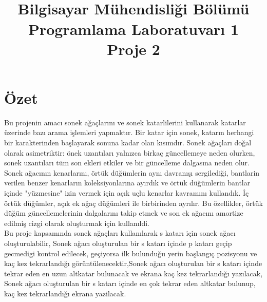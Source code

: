 \documentclass[conference]{IEEEtran}
\begin{document}
\title { \\
\LARGE {Bilgisayar Mühendisliği Bölümü}\\
\huge \textbf{Programlama Laboratuvarı 1}\\
\huge{Proje 2}}

\author
{


\and
{}
}


\maketitle
\section*{\textbf{\LARGE Özet}}
\Large{ Bu projenin amacı sonek ağaçlarını ve sonek katarlilerini kullanarak katarlar üzerinde bazı arama
işlemleri yapmaktır.
Bir katar için sonek, katarın herhangi bir karakterinden başlayarak sonuna kadar olan kısımdır.
Sonek ağaçları doğal olarak asimetriktir: önek uzantıları yalnızca birkaç güncellemeye neden olurken, sonek uzantıları tüm son ekleri etkiler ve bir güncelleme dalgasına neden olur. Sonek ağacının kenarlarını, örtük düğümlerin aynı davranışı sergilediği, bantlarin verilen benzer kenarların koleksiyonlarına ayırdık ve örtük düğümlerin bantlar içinde "yüzmesine" izin vermek için açık uçlu kenarlar kavramını kullandık. İç örtük düğümler, açık ek ağaç düğümleri ile birbirinden ayrılır. Bu özellikler, örtük düğüm güncellemelerinin dalgalarını takip etmek ve son ek ağacını amortize edilmiş cizgi olarak oluşturmak için kullanıldi.\\
Bu proje kapsamında sonek ağaçları kullanılarak s katarı için sonek ağacı oluşturulabilir, Sonek ağacı oluşturulan bir s katarı içinde p katarı geçip gecmedigi kontrol edilecek, geçiyorsa ilk bulunduğu yerin
başlangıç pozisyonu ve kaç kez tekrarlandığı görüntülenecektir,Sonek ağacı oluşturulan bir s katarı içinde tekrar eden en uzun altkatar bulunacak ve ekrana kaç kez tekrarlandığı yazılacak, Sonek ağacı oluşturulan bir s katarı içinde en çok tekrar eden altkatar bulunup, kaç kez tekrarlandığı ekrana yazilacak.
}
\end{document}
